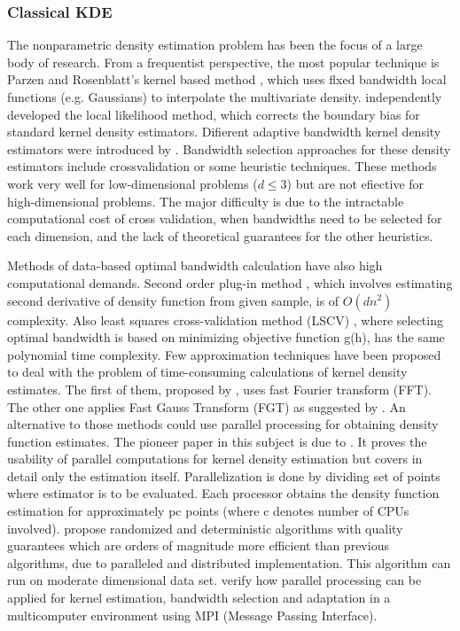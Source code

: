 \subsubsection{Classical KDE}
The nonparametric density estimation problem has been the focus of a large body of research. 
From a frequentist perspective, the most popular technique is Parzen and Rosenblatt’s kernel based method \citep{parzen1962estimation, rosenblatt1956remarks}, which uses flxed bandwidth local functions (e.g. Gaussians) to interpolate the multivariate density. 
\cite{hjort1996locally, hjort1995nonparametric, loader1996local} independently developed the local likelihood method, which corrects the boundary bias for standard kernel density estimators. 
Difierent adaptive bandwidth kernel density estimators were introduced by \cite{terrell1992variable,sain1996locally,staniswalis1989local}. 
Bandwidth selection approaches for these density estimators include crossvalidation or some heuristic techniques. 
These methods work very well for low-dimensional problems ($d \le 3$) but are not efiective for high-dimensional problems. 
The major difficulty is due to the intractable computational cost of cross validation, when bandwidths need to be selected for each dimension, and the lack of theoretical guarantees for the other heuristics. 

Methods of data-based optimal bandwidth calculation have also high computational demands. 
Second order plug-in method \citep{sheather1991reliable}, which involves estimating second derivative of density function from given sample, is of $O(dn^2)$ complexity. 
Also least squares cross-validation method (LSCV) \citep{rudemo1982empirical,bowman1984alternative}, where selecting optimal bandwidth is based on minimizing objective function g(h), has the same polynomial time complexity. 
Few approximation techniques have been proposed to deal with the problem of time-consuming calculations of kernel density estimates. 
The first of them, proposed by \cite{silverman1982algorithm}, uses fast Fourier transform (FFT). The other one applies Fast Gauss Transform (FGT) as suggested by \cite{elgammal2003efficient}. 
An alternative to those methods could use parallel processing for obtaining density function estimates. 
The pioneer paper in this subject is due to \cite{racine2002parallel}. 
It proves the usability of parallel computations for kernel density estimation but covers in detail only the estimation itself. 
Parallelization is done by dividing set of points where estimator is to be evaluated. 
Each processor obtains the density function estimation for approximately pc points (where c denotes number of CPUs involved).  
\cite{zheng2013quality} propose randomized and deterministic algorithms with quality guarantees which are orders of magnitude more efficient than previous algorithms, due to paralleled and distributed implementation. This algorithm can run on moderate dimensional data set.
\cite{Lukasik2007} verify how parallel processing can be applied for kernel estimation, bandwidth selection and adaptation in a multicomputer environment using MPI (Message Passing Interface)\citep{snir1998mpi}. 

